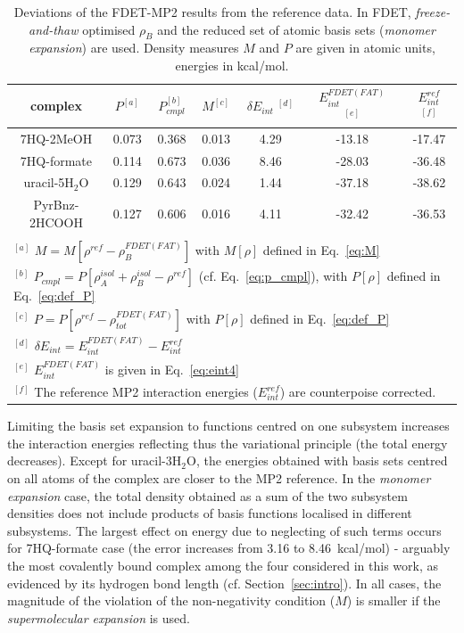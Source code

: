\documentclass[amsmath,amssymb,preprint,aip,jcp]{revtex4-1}
\begin{document}
\begin{table}
{
\begin{center}
\begin{tabular}{|c|c|c|c|c|c|c|}
\hline
 complex & $P^{[a]}$ & $P_{cmpl}^{[b]}$ & $M^{[c]}$ & $\delta E_{int}\;^{[d]}$ & $E^{FDET(FAT)}_{int}$ $^{[e]}$ & $E_{int}^{ref}$ $^{[f]}$ \\ \hline
7HQ-2MeOH & 0.073 & 0.368 & 0.013 & 4.29 & -13.18 & -17.47 \\ \hline
7HQ-formate & 0.114 & 0.673 & 0.036 & 8.46 & -28.03 & -36.48 \\ \hline
uracil-5H$_2$O & 0.129 & 0.643 & 0.024 & 1.44 & -37.18 & -38.62 \\ \hline
PyrBnz-2HCOOH & 0.127 & 0.606 & 0.016 & 4.11 & -32.42 & -36.53 \\ \hline
\multicolumn{7}{c}{ } \\
\multicolumn{7}{l}{$^{[a]}$ $M=M[\rho^{ref} - \rho^{FDET(FAT)}_{B}]$ with $M[\rho]$ defined in Eq.~\ref{eq:M}}\\
\multicolumn{7}{l}{$^{[b]}$ $P_{cmpl}=P[\rho_A^{isol}+\rho_B^{isol} - \rho^{ref}]$ (cf. Eq.~\ref{eq:p_cmpl}), with $P[\rho]$ defined in Eq.~\ref{eq:def_P}}\\
\multicolumn{7}{l}{$^{[c]}$ $P=P[\rho^{ref} - \rho_{tot}^{FDET(FAT)}]$ with $P[\rho]$ defined in Eq.~\ref{eq:def_P}}\\
\multicolumn{7}{l}{$^{[d]}$ $\delta E_{int}=E^{FDET(FAT)}_{int}-E_{int}^{ref}$} \\
\multicolumn{7}{l}{$^{[e]}$ $E^{FDET(FAT)}_{int}$ is given in Eq.~\ref{eq:eint4}}\\
\multicolumn{7}{l}{$^{[f]}$ The reference MP2 interaction energies ($E_{int}^{ref}$) are counterpoise corrected.}
\end{tabular}
\end{center}
}%
\caption{Deviations of the FDET-MP2 results from the reference data. In FDET, \textit{freeze-and-thaw} optimised $\rho_B$ and the reduced set of atomic basis sets ({\it monomer expansion}) are used. Density measures $M$ and $P$ are given in atomic units, energies in kcal/mol.
}
\label{table:ME_FAT}
\end{table}

Limiting the basis set expansion to functions centred on one subsystem increases the interaction energies reflecting thus the variational principle (the total energy decreases). Except for uracil-3H$_2$O, the energies obtained with basis sets centred on all atoms of the complex are closer to the MP2 reference. In the {\it monomer expansion} case, the total density obtained as a sum of the two subsystem densities
does not include products of basis functions localised in different subsystems. The largest effect on energy due to neglecting of such terms occurs for 7HQ-formate case (the error increases from 3.16 to 8.46~kcal/mol) - arguably the most covalently bound complex among the four considered in this work, as evidenced by its hydrogen bond length (cf. Section~\ref{sec:intro}). In all cases, the magnitude of the violation of the non-negativity condition ($M$) is smaller if the {\it supermolecular expansion} is used. 
\end{document}
